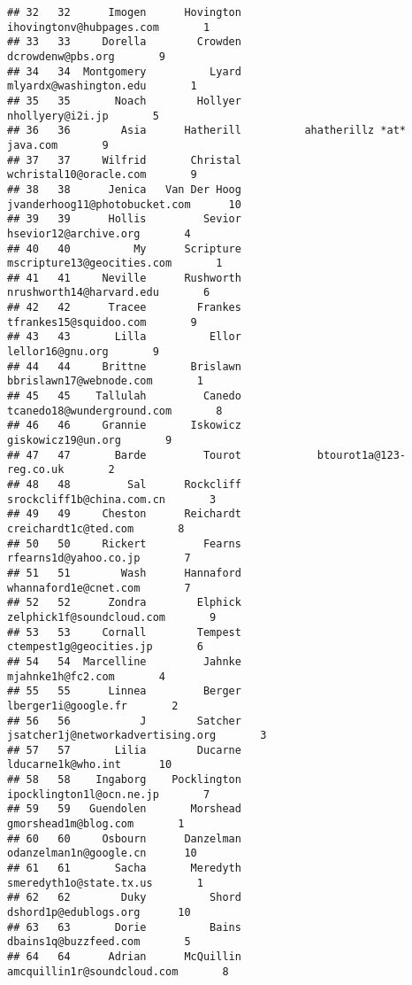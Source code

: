 \documentclass[]{article}
\begin{document}
\begin{verbatim}
## 32   32      Imogen      Hovington           ihovingtonv@hubpages.com       1
## 33   33     Dorella        Crowden                  dcrowdenw@pbs.org       9
## 34   34  Montgomery          Lyard             mlyardx@washington.edu       1
## 35   35       Noach        Hollyer                   nhollyery@i2i.jp       5
## 36   36        Asia      Hatherill          ahatherillz *at* java.com       9
## 37   37     Wilfrid       Christal             wchristal10@oracle.com       9
## 38   38      Jenica   Van Der Hoog      jvanderhoog11@photobucket.com      10
## 39   39      Hollis         Sevior              hsevior12@archive.org       4
## 40   40          My      Scripture         mscripture13@geocities.com       1
## 41   41     Neville      Rushworth           nrushworth14@harvard.edu       6
## 42   42      Tracee        Frankes             tfrankes15@squidoo.com       9
## 43   43       Lilla          Ellor                   lellor16@gnu.org       9
## 44   44     Brittne       Brislawn            bbrislawn17@webnode.com       1
## 45   45    Tallulah         Canedo         tcanedo18@wunderground.com       8
## 46   46     Grannie       Iskowicz                 giskowicz19@un.org       9
## 47   47       Barde         Tourot            btourot1a@123-reg.co.uk       2
## 48   48         Sal      Rockcliff          srockcliff1b@china.com.cn       3
## 49   49     Cheston      Reichardt               creichardt1c@ted.com       8
## 50   50     Rickert         Fearns              rfearns1d@yahoo.co.jp       7
## 51   51        Wash      Hannaford              whannaford1e@cnet.com       7
## 52   52      Zondra        Elphick          zelphick1f@soundcloud.com       9
## 53   53     Cornall        Tempest            ctempest1g@geocities.jp       6
## 54   54  Marcelline         Jahnke                  mjahnke1h@fc2.com       4
## 55   55      Linnea         Berger                lberger1i@google.fr       2
## 56   56           J        Satcher  jsatcher1j@networkadvertising.org       3
## 57   57       Lilia        Ducarne                 lducarne1k@who.int      10
## 58   58    Ingaborg    Pocklington           ipocklington1l@ocn.ne.jp       7
## 59   59   Guendolen       Morshead               gmorshead1m@blog.com       1
## 60   60     Osbourn      Danzelman             odanzelman1n@google.cn      10
## 61   61       Sacha       Meredyth            smeredyth1o@state.tx.us       1
## 62   62        Duky          Shord              dshord1p@edublogs.org      10
## 63   63       Dorie          Bains              dbains1q@buzzfeed.com       5
## 64   64      Adrian      McQuillin        amcquillin1r@soundcloud.com       8

\end{verbatim}
\end{document}
